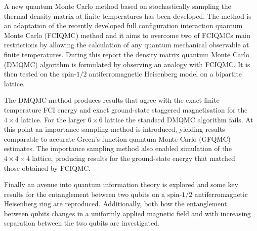 


\begin{abstracts}        %
A new quantum Monte Carlo method based on stochastically sampling the thermal density matrix at finite temperatures has been developed. The method is an adaptation of the recently developed full configuration interaction quantum Monte Carlo\cite{Booth2009} (FCIQMC) method and it aims to overcome two of FCIQMCs main restrictions by allowing the calculation of any quantum mechanical observable at finite temperatures. During this report the density matrix quantum Monte Carlo (DMQMC) algorithm is formulated by observing an analogy with FCIQMC. It is then tested on the spin-$1/2$ antiferromagnetic Heisenberg model on a bipartite lattice.

The DMQMC method produces results that agree with the exact finite temperature FCI energy and exact ground-state staggered magnetisation for the $4\times4$ lattice. For the larger $6\times6$ lattice the standard DMQMC algorithm fails.  At this point an importance sampling method is introduced, yielding results comparable to accurate Green's function quantum Monte Carlo (GFQMC) estimates. The importance sampling method also enabled simulation of the $4\times4\times4$ lattice, producing results for the ground-state energy that matched those obtained by FCIQMC.

Finally an avenue into quantum information theory is explored and some key results for the entanglement between two qubits on a spin-$1/2$ antiferromagnetic Heisenberg ring are reproduced.  Additionally, both how the entanglement between qubits changes in a uniformly applied magnetic field and with increasing separation between the two qubits are investigated. 

\end{abstracts}




